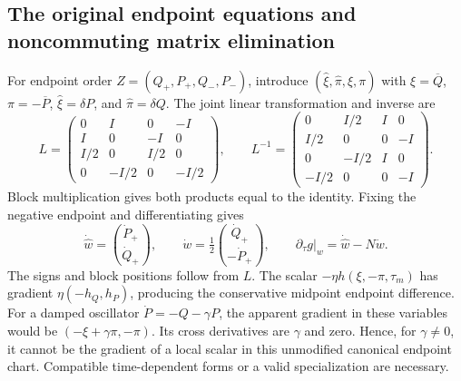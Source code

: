 \subsection{The original endpoint equations and noncommuting matrix elimination}
For endpoint order $Z=(Q_+,P_+,Q_-,P_-)$, introduce $(\widehat\xi,\widehat\pi,\xi,\pi)$ with $\xi=\overline Q$, $\pi=-\overline P$, $\widehat\xi=\delta P$, and $\widehat\pi=\delta Q$. The joint linear transformation and inverse are
\begin{equation}
 L=\begin{pmatrix}
 0&I&0&-I\\I&0&-I&0\\I/2&0&I/2&0\\0&-I/2&0&-I/2
 \end{pmatrix},\qquad
 L^{-1}=\begin{pmatrix}
 0&I/2&I&0\\I/2&0&0&-I\\0&-I/2&I&0\\-I/2&0&0&-I
 \end{pmatrix}.
 \label{eq:sup-original-matrix}
\end{equation}
Block multiplication gives both products equal to the identity. Fixing the negative endpoint and differentiating gives
\begin{equation}
 \dot{\widehat w}=\binom{\dot P_+}{\dot Q_+},\qquad
 \dot w=\tfrac12\binom{\dot Q_+}{-\dot P_+},\qquad
 \partial_\tau g|_w=\dot{\widehat w}-N\dot w.
 \label{eq:sup-original-chain}
\end{equation}
The signs and block positions follow from $L$. The scalar $-\eta h(\xi,-\pi,\tau_m)$ has gradient $\eta(-h_Q,h_P)$, producing the conservative midpoint endpoint difference. For a damped oscillator $\dot P=-Q-\gamma P$, the apparent gradient in these variables would be $(-\xi+\gamma\pi,-\pi)$. Its cross derivatives are $\gamma$ and zero. Hence, for $\gamma\ne0$, it cannot be the gradient of a local scalar in this unmodified canonical endpoint chart. Compatible time-dependent forms or a valid specialization are necessary.

